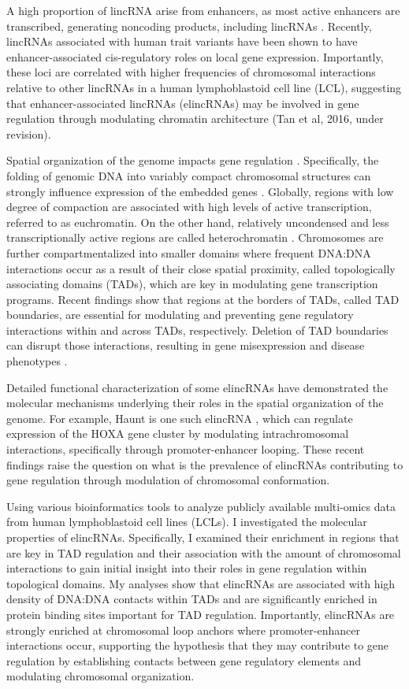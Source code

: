 \documentclass[11pt,a4paper]{report}
\begin{document}
A high proportion of lincRNA arise from enhancers, as most active enhancers are transcribed, generating noncoding products, including lincRNAs \cite{Guil2012}. Recently, lincRNAs associated with human trait variants have been shown to have enhancer-associated cis-regulatory roles on local gene expression. Importantly, these loci are correlated with higher frequencies of chromosomal interactions relative to other lincRNAs in a human lymphoblastoid cell line (LCL), suggesting that enhancer-associated lincRNAs (elincRNAs) may be involved in gene regulation through modulating chromatin architecture (Tan et al, 2016, under revision). 

Spatial organization of the genome impacts gene regulation \cite{Engreitz2016}⁠⁠. Specifically, the folding of genomic DNA into variably compact chromosomal structures can strongly influence expression of the embedded genes \cite{Gorkin2014}⁠⁠. Globally, regions with low degree of compaction are associated with high levels of active transcription, referred to as euchromatin. On the other hand, relatively uncondensed and less transcriptionally active regions are called heterochromatin \cite{Passarge1979}\cite{Tamaru2010}⁠. Chromosomes are further compartmentalized into smaller domains where frequent DNA:DNA interactions occur as a result of their close spatial proximity, called topologically associating domains (TADs), which are key in modulating gene transcription programs. Recent findings show that regions at the borders of TADs, called TAD boundaries, are essential for modulating and preventing gene regulatory interactions within and across TADs, respectively. Deletion of TAD boundaries can disrupt those interactions, resulting in gene misexpression and disease phenotypes \cite{Lupianez2015}⁠.

Detailed functional characterization of some elincRNAs have demonstrated the molecular mechanisms underlying their roles in the spatial organization of the genome. For example, Haunt is one such elincRNA \cite{Yin2015}⁠⁠, which can regulate expression of the HOXA gene cluster by modulating intrachromosomal interactions, specifically through promoter-enhancer looping. These recent findings raise the question on what is the prevalence of elincRNAs contributing to gene regulation through modulation of chromosomal conformation.

Using various bioinformatics tools to analyze publicly available multi-omics data from human lymphoblastoid cell lines (LCLs). I investigated the molecular properties of elincRNAs. Specifically, I examined their enrichment in regions that are key in TAD regulation and their association with the amount of chromosomal interactions to gain initial insight into their roles in gene regulation within topological domains. My analyses show that elincRNAs are associated with high density of DNA:DNA contacts within TADs and are significantly enriched in protein binding sites important for TAD regulation. Importantly,  elincRNAs are strongly enriched at chromosomal loop anchors where promoter-enhancer interactions occur, supporting the hypothesis that they may contribute to gene regulation by establishing contacts between gene regulatory elements and modulating chromosomal organization.
\end{document}
